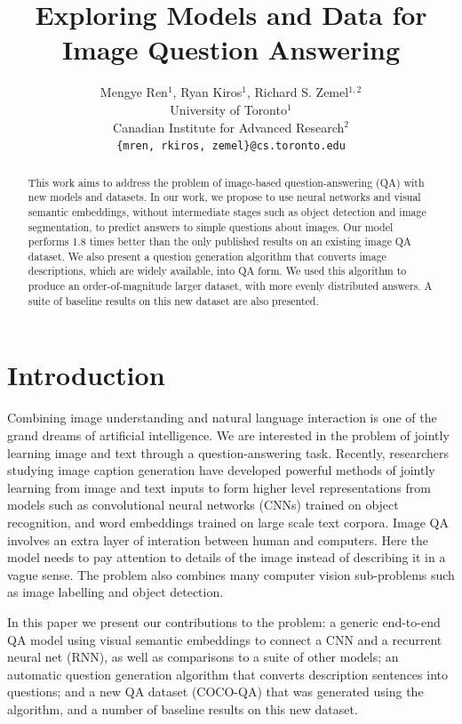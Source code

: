 \documentclass{article} %
\title{Exploring Models and Data for Image Question Answering}
\author{
Mengye Ren${}^1$, Ryan Kiros${}^1$, Richard S. Zemel${}^{1, 2}$\\
University of Toronto${}^1$\\
Canadian Institute for Advanced Research${}^2$\\
\texttt{\{mren, rkiros, zemel\}@cs.toronto.edu} \\
}
\renewcommand{\#}[1]{\textbf{#1}}
\begin{document}
\maketitle

\begin{abstract}

This work aims to address the problem of image-based question-answering (QA)
with new models and datasets. In our work, we propose to use neural networks
and visual semantic embeddings, without intermediate stages such as object
detection and image segmentation, to predict answers to simple questions about
images. Our model performs 1.8 times better than the only published results on
an existing image QA dataset. We also present a question generation algorithm
that converts image descriptions, which are widely available, into QA form. We
used this algorithm to produce an order-of-magnitude larger dataset, with more
evenly distributed answers. A suite of baseline results on this new dataset
are also presented.

\end{abstract}

\section{Introduction}

Combining image understanding and natural language interaction is one of the
grand dreams of artificial intelligence. We are interested in the problem of
jointly learning image and text through a question-answering task. Recently,
researchers studying image caption generation \cite{vinyals14,kiros14b,
karpathy14,mao14,donahue14,chen14,fang14,xu15,lebret15,klein15} have developed
powerful methods of jointly learning from image and text inputs to form higher
level representations from models such as convolutional neural networks (CNNs)
trained on object recognition, and word embeddings trained on large scale text
corpora. Image QA  involves an extra layer of interation between human and
computers. Here the  model needs to pay attention to details of the image
instead of describing it  in a vague sense. The problem also combines many
computer vision sub-problems  such as image labelling and object detection.

In this paper we present our contributions to the problem: a generic end-to-end
QA model using visual semantic embeddings to connect a CNN and a recurrent
neural net (RNN), as well as comparisons to a suite of other models; an
automatic question generation algorithm that converts description sentences
into questions; and a new QA dataset (COCO-QA) that was generated using the
algorithm, and a number of baseline results on this new dataset.
\end{document}
